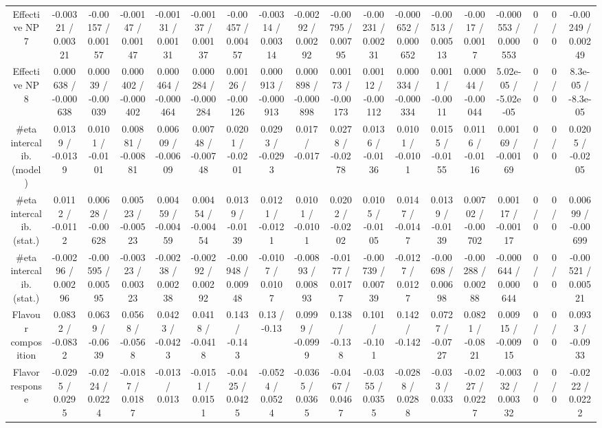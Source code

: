 \documentclass[10pt]{article}
\begin{document}
\begin{table}[htbp]
\begin{center}
\begin{tabular}{|c|c|c|c|c|c|c|c|c|c|c|c|c|c|c|c|c|c|}
  Effective NP 7 & -0.00321 / 0.00321 & -0.00157 / 0.00157 & -0.00147 / 0.00147 & -0.00131 / 0.00131 & -0.00137 / 0.00137 & -0.00457 / 0.00457 & -0.00314 / 0.00314 & -0.00292 / 0.00292 & -0.00795 / 0.00795 & -0.00231 / 0.00231 & -0.000652 / 0.000652 & -0.00513 / 0.00513 & -0.0017 / 0.0017 & -0.000553 / 0.000553 & 0 / 0 & 0 / 0 & -0.00249 / 0.00249 \\ 
  Effective NP 8 & 0.000638 / -0.000638 & 0.00039 / -0.00039 & 0.000402 / -0.000402 & 0.000464 / -0.000464 & 0.000284 / -0.000284 & 0.00126 / -0.00126 & 0.000913 / -0.000913 & 0.000898 / -0.000898 & 0.00173 / -0.00173 & 0.00112 / -0.00112 & 0.000334 / -0.000334 & 0.0011 / -0.0011 & 0.00044 / -0.00044 & 5.02e-05 / -5.02e-05 & 0 / 0 & 0 / 0 & 8.3e-05 / -8.3e-05 \\ 
  #eta intercalib. (model) & 0.0139 / -0.0139 & 0.0101 / -0.0101 & 0.00881 / -0.00881 & 0.00609 / -0.00609 & 0.00748 / -0.00748 & 0.0201 / -0.0201 & 0.0293 / -0.0293 & 0.017 / -0.017 & 0.0278 / -0.0278 & 0.0136 / -0.0136 & 0.0101 / -0.0101 & 0.0155 / -0.0155 & 0.0116 / -0.0116 & 0.00169 / -0.00169 & 0 / 0 & 0 / 0 & 0.0205 / -0.0205 \\ 
  #eta intercalib. (stat.) & 0.0112 / -0.0112 & 0.00628 / -0.00628 & 0.00523 / -0.00523 & 0.00459 / -0.00459 & 0.00454 / -0.00454 & 0.0139 / -0.0139 & 0.0121 / -0.0121 & 0.0101 / -0.0101 & 0.0202 / -0.0202 & 0.0105 / -0.0105 & 0.0147 / -0.0147 & 0.0139 / -0.0139 & 0.00702 / -0.00702 & 0.00117 / -0.00117 & 0 / 0 & 0 / 0 & 0.00699 / -0.00699 \\ 
  #eta intercalib. (stat.) & -0.00296 / 0.00296 & -0.00595 / 0.00595 & -0.00323 / 0.00323 & -0.00238 / 0.00238 & -0.00292 / 0.00292 & -0.00948 / 0.00948 & -0.0107 / 0.0107 & -0.00893 / 0.00893 & -0.0177 / 0.0177 & -0.00739 / 0.00739 & -0.0127 / 0.0127 & -0.00698 / 0.00698 & -0.00288 / 0.00288 & -0.000644 / 0.000644 & 0 / 0 & 0 / 0 & -0.00521 / 0.00521 \\ 
  Flavour composition & 0.0832 / -0.0832 & 0.0639 / -0.0639 & 0.0568 / -0.0568 & 0.0423 / -0.0423 & 0.0418 / -0.0418 & 0.143 / -0.143 & 0.13 / -0.13 & 0.0999 / -0.0999 & 0.138 / -0.138 & 0.101 / -0.101 & 0.142 / -0.142 & 0.0727 / -0.0727 & 0.0821 / -0.0821 & 0.00915 / -0.00915 & 0 / 0 & 0 / 0 & 0.0933 / -0.0933 \\ 
  Flavor response & -0.0295 / 0.0295 & -0.0224 / 0.0224 & -0.0187 / 0.0187 & -0.013 / 0.013 & -0.0151 / 0.0151 & -0.0425 / 0.0425 & -0.0524 / 0.0524 & -0.0365 / 0.0365 & -0.0467 / 0.0467 & -0.0355 / 0.0355 & -0.0288 / 0.0288 & -0.033 / 0.033 & -0.0227 / 0.0227 & -0.00332 / 0.00332 & 0 / 0 & 0 / 0 & -0.0222 / 0.0222 \\ 

\end{tabular}
\end{center}
\end{table}
\end{document}
